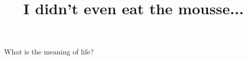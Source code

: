 \documentclass[hidesidemenu]{webquiztex}
\title{I didn't even eat the mousse...}
\begin{document}
  \begin{question}
    What is the meaning of life?
  \end{question}
\end{document}
